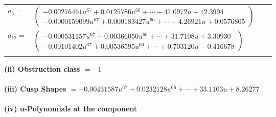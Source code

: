 \documentclass[1p]{elsarticle_modified}
\theoremstyle{definition}
\begin{document}
\begin{tabular}{m{7pt} m{180pt} m{7pt} m{180pt} }
\flushright $a_{4}=$&$\begin{pmatrix}-0.00276461 u^{67}+0.0125786 u^{66}+\cdots-47.0972 u-12.3994\\-0.0000159099 u^{67}+0.000183427 u^{66}+\cdots-4.26921 u+0.0576805\end{pmatrix}$ \\
\flushright $a_{12}=$&$\begin{pmatrix}-0.000531157 u^{67}+0.00366050 u^{66}+\cdots+31.7108 u+3.30930\\-0.00101402 u^{67}+0.00536595 u^{66}+\cdots+0.703120 u-0.416678\end{pmatrix}$\\&\end{tabular}
\flushleft \textbf{(ii) Obstruction class $= -1$}\\~\\
\flushleft \textbf{(iii) Cusp Shapes $= -0.00431587 u^{67}+0.0232128 u^{66}+\cdots+33.1103 u+8.26277$}\\~\\
\newpage\renewcommand{\arraystretch}{1}
\flushleft \textbf{(iv) u-Polynomials at the component}\newline \\
\end{document}
